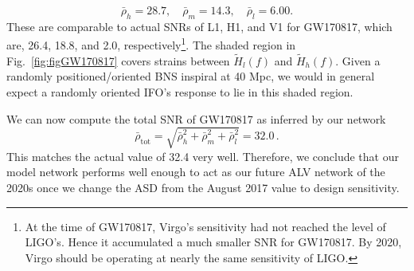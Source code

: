 \documentclass[prd,amsmath,amssymb,aps,floats,amsfonts,notitlepage,superscriptaddress,eqsecnum,nofootinbib,10pt]{revtex4-1}
\newcommand{\be}{\begin{equation}}
\newcommand{\ee}{\end{equation}}
\begin{document}
%
\be
\bar\rho_h = 28.7,\quad \bar\rho_m = 14.3,\quad \bar\rho_l = 6.00 \label{eq:GW170817_SNRs}.
\ee
%
These are comparable to actual SNRs of L1, H1, and V1 for GW170817, which are, 26.4, 18.8, and 2.0, respectively\footnote{At the time of GW170817, Virgo's sensitivity had not reached the level of LIGO's. Hence it accumulated a much smaller SNR for GW170817. By 2020, Virgo should be operating at nearly the same sensitivity of LIGO.}.
The shaded region in Fig.~\ref{fig:figGW170817} covers strains between $\tilde{H}_l(f)$ and $\tilde{H}_h(f)$. %
Given a randomly positioned/oriented BNS inspiral at 40 Mpc, we would in general expect a randomly oriented IFO's response to lie in this shaded region.
%

%
%

We can now compute the total SNR of GW170817 as inferred by our network
%
\be
\bar\rho_\text{tot}= \sqrt{\bar\rho^2_h+\bar\rho^2_m+\bar\rho^2_l}= 32.0 \, \label{eq:SNR_total_GW170817} .
\ee
%
This matches the actual value of 32.4 very well. Therefore, we conclude that our model network performs well enough to 
act as our future ALV network of the 2020s once we change
the ASD from the August 2017 value to design sensitivity.
%
%
%
%
%
\end{document}
